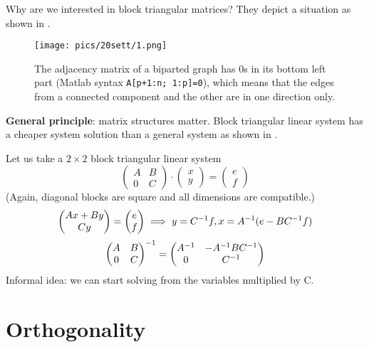 \documentclass[computationalMathematics.tex]{subfiles}
\begin{document}
Why are we interested in block triangular matrices? They depict a situation as shown in .
\begin{figure}[H]
    \centering
    \texttt{[image: pics/20sett/1.png]}
    \caption{The adjacency matrix of a biparted graph has $0$s in its bottom left part (Matlab syntax \texttt{A[p+1:n; 1:p]=0}), which means that the edges from a connected component and the other are in one direction only.}\label{fig:20sett3}
\end{figure}

\textbf{General principle}: matrix structures matter. Block triangular linear system has a cheaper system solution than a general system as shown in .

\begin{example}\label{exp1:20sett}
Let us take a $2\times2$ block triangular linear system\\
  \[
\begin{pmatrix}
    A & B\\
    0 & C
\end{pmatrix}
\cdot
\begin{pmatrix}
    x \\
    y 
\end{pmatrix} = 
\begin{pmatrix}
    e \\
    f 
\end{pmatrix}
\]
(Again, diagonal blocks are square and all dimensions are
compatible.)
  \[
\begin{pmatrix}
    Ax + By\\
    Cy
\end{pmatrix} = 
\begin{pmatrix}
    e \\
    f 
\end{pmatrix}\implies y = {C}^{-1}f, x = {A}^{-1}(e - B{C}^{-1}f)
\]
  \[
\begin{pmatrix}
    A & B\\
    0 & C
\end{pmatrix}^{-1} = 
\begin{pmatrix}
          {A}^{-1} & -{A}^{-1}B{C}^{-1}\\
          0 & {C}^{-1}
        \end{pmatrix}
      \]
Informal idea: we can start solving from the variables multiplied by C.
\end{example}

\section{Orthogonality}
\end{document}
